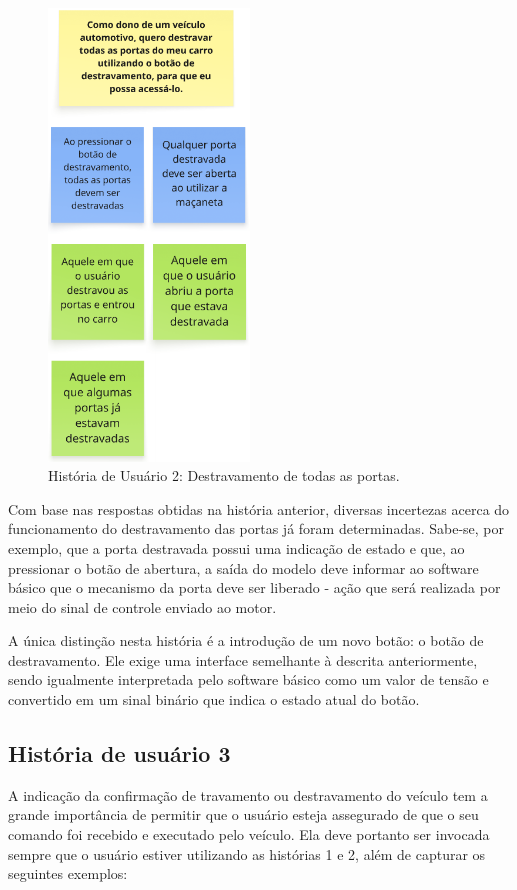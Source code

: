\begin{figure}[H]
\centering
\includegraphics[height=12cm]{figuras/user_story_2.png}
\caption{História de Usuário 2: Destravamento de todas as portas.}
\label{fig:historia2}
\end{figure}

Com base nas respostas obtidas na história anterior, diversas incertezas acerca do funcionamento do destravamento das portas já foram determinadas. Sabe-se, 
por exemplo, que a porta destravada possui uma indicação de estado e que, ao pressionar o botão de abertura, a saída do modelo deve informar ao software básico 
que o mecanismo da porta deve ser liberado - ação que será realizada por meio do sinal de controle enviado ao motor.

A única distinção nesta história é a introdução de um novo botão: o botão de destravamento. Ele exige uma interface semelhante à descrita anteriormente, sendo 
igualmente interpretada pelo software básico como um valor de tensão e convertido em um sinal binário que indica o estado atual do botão.

\subsection{História de usuário 3}

A indicação da confirmação de travamento ou destravamento do veículo tem a grande importância de permitir que o usuário esteja assegurado de que o seu comando foi 
recebido e executado pelo veículo. Ela deve portanto ser invocada sempre que o usuário estiver utilizando as histórias 1 e 2, além de capturar 
os seguintes exemplos:

